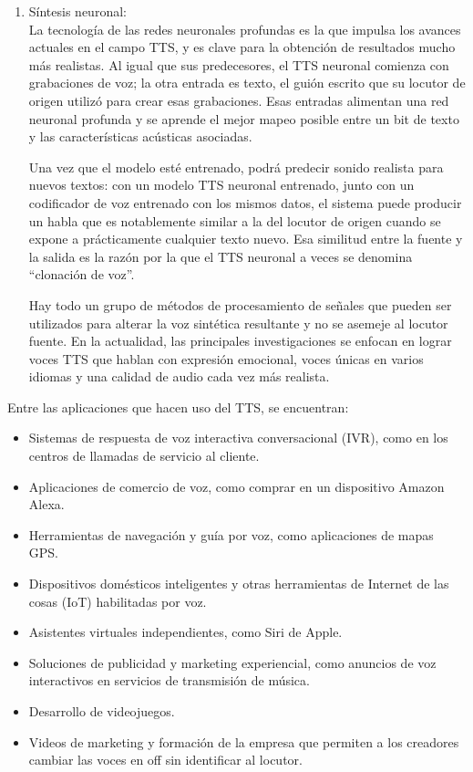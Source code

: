 \begin{enumerate}
	\item Síntesis neuronal: \\ La tecnología de las redes neuronales profundas es la que impulsa los avances actuales en el campo TTS, y es clave para la obtención de resultados mucho más realistas. Al igual que sus predecesores, el TTS neuronal comienza con grabaciones de voz; la otra entrada es texto, el guión escrito que su locutor de origen utilizó para crear esas grabaciones. Esas entradas alimentan una red neuronal profunda y se aprende el mejor mapeo posible entre un bit de texto y las características acústicas asociadas. 
	
	Una vez que el modelo esté entrenado, podrá predecir sonido realista para nuevos textos: con un modelo TTS neuronal entrenado, junto con un codificador de voz entrenado con los mismos datos, el sistema puede producir un habla que es notablemente similar a la del locutor de origen cuando se expone a prácticamente cualquier texto nuevo. Esa similitud entre la fuente y la salida	es la razón por la que el TTS neuronal a veces se denomina “clonación de voz”.
	
	Hay todo un grupo de métodos de procesamiento de señales que pueden ser utilizados para alterar la voz sintética resultante y no se asemeje al locutor fuente. En la actualidad, las principales investigaciones se enfocan en lograr voces TTS que hablan con expresión emocional, voces únicas en varios idiomas y una calidad de audio cada vez más realista.
\end{enumerate}

Entre las aplicaciones que hacen uso del TTS, se encuentran:

\begin{itemize}
	\item Sistemas de respuesta de voz interactiva conversacional (IVR), como en los centros de llamadas de servicio al cliente.
	
	\item Aplicaciones de comercio de voz, como comprar en un dispositivo Amazon Alexa.
	\item Herramientas de navegación y guía por voz, como aplicaciones de mapas GPS.
	\item Dispositivos domésticos inteligentes y otras herramientas de Internet de las cosas (IoT) habilitadas por voz.
	\item Asistentes virtuales independientes, como Siri de Apple.
	\item Soluciones de publicidad y marketing experiencial, como anuncios de voz interactivos en servicios de transmisión de música.
	\item Desarrollo de videojuegos.
	\item Videos de marketing y formación de la empresa que permiten a los creadores cambiar las	voces en off sin identificar al locutor.
\end{itemize}


